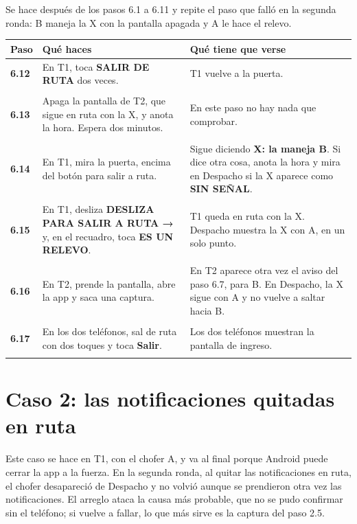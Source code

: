 \documentclass[10pt,a4paper]{article}
\makeatletter
\newcommand{\toca}[1]{\textcolor{azul}{\textbf{#1}}}
\newcommand{\pantalla}[1]{\textcolor{marron}{\textbf{#1}}}
\newcommand{\nada}{\textcolor{tenue}{En este paso no hay nada que comprobar.}}
\newcommand{\caja}[2]{\hbox{\vrule height #1 depth 0pt width 0pt #2}}
\newcommand{\campo}[3]{%
  \raisebox{-0.35\height}{\caja{#3}{\TextField[name=#1, width=#2, height=#3, charsize=8pt, bordercolor={0.55 0.6 0.68},
    backgroundcolor={0.965 0.976 0.992}, multiline=true]{}}}}
\newcommand{\resultado}[1]{%
  \caja{9pt}{\ChoiceMenu[radio, name=resultado-#1, width=9pt, height=9pt, radiosymbol=l,
    bordercolor={0.35 0.38 0.45}, default=]{}{OK=ok,FALLA=falla,NO SE PUDO=nopudo}}}
\newcommand{\paso}[4]{%
  \textbf{#1} & #3 & #4 \\*
  \multicolumn{3}{@{\hspace{6pt}}l@{}}{\rule{0pt}{15pt}\small
    \resultado{#2}\hspace{0.4em}Hora:~\campo{hora-#2}{1.7cm}{13pt}\hspace{1.2em}Nota:~\campo{nota-#2}{8.3cm}{22pt}}\\[3pt]
  \hline
}
\newenvironment{pasos}{%
  \begin{longtable}{@{\hspace{6pt}}>{\raggedright\arraybackslash}p{0.9cm}>{\raggedright\arraybackslash}p{7.9cm}>{\raggedright\arraybackslash}p{7.3cm}@{}}
  \rowcolor{cabecera}\textbf{Paso} & \textbf{Qué haces} & \textbf{Qué tiene que verse} \\ \hline
  \endhead
}{\end{longtable}\vspace{-0.6em}}
\makeatother
\begin{document}
\begin{Form}
Se hace después de los pasos 6.1 a 6.11 y repite el paso que falló en la segunda ronda: B maneja la X con la pantalla apagada y A le hace el relevo.

\begin{pasos}
\paso{6.12}{6-12}{En T1, toca \toca{SALIR DE RUTA} dos veces.}{T1 vuelve a la puerta.}
\paso{6.13}{6-13}{Apaga la pantalla de T2, que sigue en ruta con la X, y anota la hora. Espera dos minutos.}{\nada}
\paso{6.14}{6-14}{En T1, mira la puerta, encima del botón para salir a ruta.}{Sigue diciendo \pantalla{X: la maneja B}. Si dice otra cosa, anota la hora y mira en Despacho si la X aparece como \pantalla{SIN SEÑAL}.}
\paso{6.15}{6-15}{En T1, desliza \toca{DESLIZA PARA SALIR A RUTA →} y, en el recuadro, toca \toca{ES UN RELEVO}.}{T1 queda en ruta con la X. Despacho muestra la X con A, en un solo punto.}
\paso{6.16}{6-16}{En T2, prende la pantalla, abre la app y saca una captura.}{En T2 aparece otra vez el aviso del paso 6.7, para B. En Despacho, la X sigue con A y no vuelve a saltar hacia B.}
\paso{6.17}{6-17}{En los dos teléfonos, sal de ruta con dos toques y toca \toca{Salir}.}{Los dos teléfonos muestran la pantalla de ingreso.}
\end{pasos}

\section{Caso 2: las notificaciones quitadas en ruta}

Este caso se hace en T1, con el chofer A, y va al final porque Android puede cerrar la app a la fuerza. En la segunda ronda, al quitar las notificaciones en ruta, el chofer desapareció de Despacho y no volvió aunque se prendieron otra vez las notificaciones. El arreglo ataca la causa más probable, que no se pudo confirmar sin el teléfono; si vuelve a fallar, lo que más sirve es la captura del paso 2.5.


\end{Form}
\end{document}
